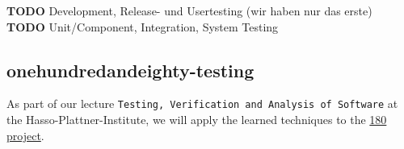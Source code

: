 \documentclass[]{article}
\begin{document}
\textbf{TODO} Development, Release- und Usertesting (wir haben nur das
erste) \textbf{TODO} Unit/Component, Integration, System Testing

\subsection{onehundredandeighty-testing}\label{onehundredandeighty-testing}

As part of our lecture
\texttt{Testing, Verification and Analysis of Software} at the
Hasso-Plattner-Institute, we will apply the learned techniques to the
\href{https://github.com/knub/onehundredandeighty}{180 project}.
\end{document}
